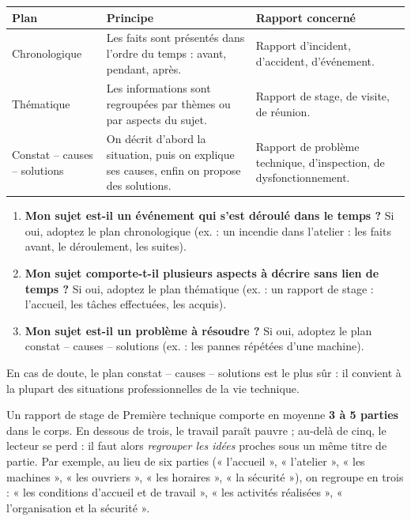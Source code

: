 \documentclass[11pt]{article}
\begin{document}
\begin{center}
\begin{tabularx}{\linewidth}{|l|X|X|}\hline
\rowcolor{popblueL} \textbf{Plan} & \textbf{Principe} & \textbf{Rapport concerné} \\ \hline
Chronologique & Les faits sont présentés dans l'ordre du temps : avant, pendant, après. & Rapport d'incident, d'accident, d'événement. \\ \hline
Thématique & Les informations sont regroupées par thèmes ou par aspects du sujet. & Rapport de stage, de visite, de réunion. \\ \hline
Constat -- causes -- solutions & On décrit d'abord la situation, puis on explique ses causes, enfin on propose des solutions. & Rapport de problème technique, d'inspection, de dysfonctionnement. \\ \hline
\end{tabularx}
\end{center}

\begin{methode}
\begin{enumerate}
\item \textbf{Mon sujet est-il un événement qui s'est déroulé dans le temps ?} Si oui, adoptez le plan chronologique (ex. : un incendie dans l'atelier : les faits avant, le déroulement, les suites).
\item \textbf{Mon sujet comporte-t-il plusieurs aspects à décrire sans lien de temps ?} Si oui, adoptez le plan thématique (ex. : un rapport de stage : l'accueil, les tâches effectuées, les acquis).
\item \textbf{Mon sujet est-il un problème à résoudre ?} Si oui, adoptez le plan constat -- causes -- solutions (ex. : les pannes répétées d'une machine).
\end{enumerate}
En cas de doute, le plan constat -- causes -- solutions est le plus sûr : il convient à la plupart des situations professionnelles de la vie technique.
\end{methode}

\begin{exemplebox}
Un rapport de stage de Première technique comporte en moyenne \textbf{3 à 5 parties} dans le corps. En dessous de trois, le travail paraît pauvre ; au-delà de cinq, le lecteur se perd : il faut alors \emph{regrouper les idées} proches sous un même titre de partie. Par exemple, au lieu de six parties (« l'accueil », « l'atelier », « les machines », « les ouvriers », « les horaires », « la sécurité »), on regroupe en trois : « les conditions d'accueil et de travail », « les activités réalisées », « l'organisation et la sécurité ».
\end{exemplebox}
\end{document}
